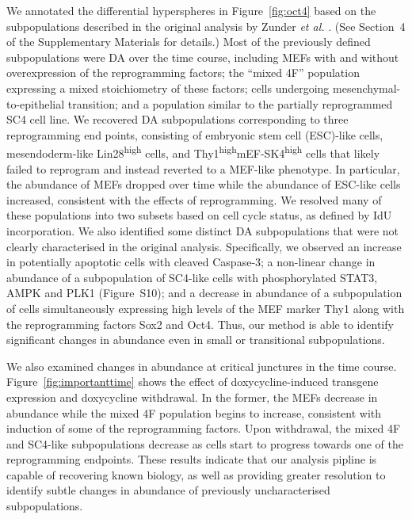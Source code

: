 \documentclass{article}
\newcommand{\suppannotate}{4}
\newcommand{\suppfignonlinear}{S10}
\begin{document}
We annotated the differential hyperspheres in Figure~\ref{fig:oct4} based on the subpopulations described in the original analysis by Zunder \emph{et al.} \cite{zunder2015continuous}.
(See Section~\suppannotate{} of the Supplementary Materials for details.)
Most of the previously defined subpopulations were DA over the time course, including MEFs with and without overexpression of the reprogramming factors; 
    the ``mixed 4F'' population expressing a mixed stoichiometry of these factors; 
    cells undergoing mesenchymal-to-epithelial transition; 
    and a population similar to the partially reprogrammed SC4 cell line.
We recovered DA subpopulations corresponding to three reprogramming end points, consisting of embryonic stem cell (ESC)-like cells, mesendoderm-like Lin28\textsuperscript{high} cells, and Thy1\textsuperscript{high}mEF-SK4\textsuperscript{high} cells that likely failed to reprogram and instead reverted to a MEF-like phenotype.
In particular, the abundance of MEFs dropped over time while the abundance of ESC-like cells increased, consistent with the effects of reprogramming.
We resolved many of these populations into two subsets based on cell cycle status, as defined by IdU incorporation.
We also identified some distinct DA subpopulations that were not clearly characterised in the original analysis.
Specifically, we observed an increase in potentially apoptotic cells with cleaved Caspase-3;
    a non-linear change in abundance of a subpopulation of SC4-like cells with phosphorylated STAT3, AMPK and PLK1 (Figure~\suppfignonlinear{});
    and a decrease in abundance of a subpopulation of cells simultaneously expressing high levels of the MEF marker Thy1 along with the reprogramming factors Sox2 and Oct4.
Thus, our method is able to identify significant changes in abundance even in small or transitional subpopulations.

We also examined changes in abundance at critical junctures in the time course.
Figure~\ref{fig:importanttime} shows the effect of doxycycline-induced transgene expression and doxycycline withdrawal.
In the former, the MEFs decrease in abundance while the mixed 4F population begins to increase, consistent with induction of some of the reprogramming factors.
Upon withdrawal, the mixed 4F and SC4-like subpopulations decrease as cells start to progress towards one of the reprogramming endpoints.
These results indicate that our analysis pipline is capable of recovering known biology, as well as providing greater resolution to identify subtle changes in abundance of previously uncharacterised subpopulations.
\end{document}
